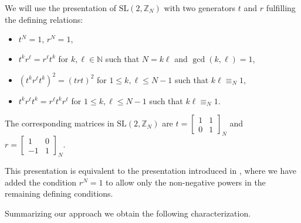\documentclass[10pt]{amsart}
\theoremstyle{plain}
\theoremstyle{definition}
\theoremstyle{remark}%
\newcommand{\N}{\mathbb{N}}
\newcommand{\Z}{\mathbb{Z}}
\newcommand{\SL}{\mathrm{SL}}
\begin{document}
We will use the presentation of $\SL(2,\Z_N)$ with  two generators $t$ and $r$ fulfilling the defining relations:
\begin{itemize}
	\item $t^{N}=1$, $r^N=1$,
	\item $t^{k}r^{\ell}=r^{\ell}t^{k}$ for $k, \ell\in\N$ such that $N=k\ell$ and $\gcd(k,\ell)=1$,
	\item $(t^k r^{\ell}t^k)^2=(trt)^2$ for $1\leq k,\ell\leq N-1$ such that $k\ell\equiv_N 1$,
	\item $t^k r^{\ell}t^k=r^{\ell}t^k r^{\ell}$ for $1\leq k,\ell\leq N-1$ such that $k\ell\equiv_N 1$.
\end{itemize}
The corresponding matrices in $\SL(2,\Z_N)$ are $t=\left[\begin{smallmatrix}1 & 1\\ 0 & 1\end{smallmatrix}\right]_{N}$ and $r=\left[\begin{smallmatrix}1 & 0\\ -1 & 1\end{smallmatrix}\right]_{N}$. 

This presentation is equivalent to the presentation introduced in \cite[Chapter 1, Section 1.4]{hopf}, where we have added the condition $r^N=1$ to allow only the non-negative powers in the remaining defining conditions.



Summarizing our approach we obtain the following characterization.
\end{document}
